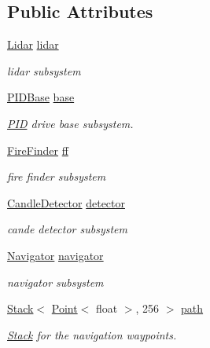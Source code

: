 \subsection*{Public Attributes}
\begin{DoxyCompactItemize}
\item 
\hyperlink{classLidar}{Lidar} \hyperlink{classRobot_a222e54f477e23f5af80cfa10bcd85e7a}{lidar}
\begin{DoxyCompactList}\small\item\em lidar subsystem \end{DoxyCompactList}\item 
\hyperlink{classPIDBase}{P\-I\-D\-Base} \hyperlink{classRobot_adbf538f97c0f9f98337f5171e715badc}{base}
\begin{DoxyCompactList}\small\item\em \hyperlink{classPID}{P\-I\-D} drive base subsystem. \end{DoxyCompactList}\item 
\hyperlink{classFireFinder}{Fire\-Finder} \hyperlink{classRobot_a342f5f8be2b5641eb3ae8f9c8475ebe6}{ff}
\begin{DoxyCompactList}\small\item\em fire finder subsystem \end{DoxyCompactList}\item 
\hyperlink{classCandleDetector}{Candle\-Detector} \hyperlink{classRobot_a19cb4c2ee87b595db9275e6b3d9ca30d}{detector}
\begin{DoxyCompactList}\small\item\em cande detector subsystem \end{DoxyCompactList}\item 
\hyperlink{classNavigator}{Navigator} \hyperlink{classRobot_a71e296a4f32c3a81b5a9fabeac12747b}{navigator}
\begin{DoxyCompactList}\small\item\em navigator subsystem \end{DoxyCompactList}\item 
\hyperlink{classStack}{Stack}$<$ \hyperlink{classPoint}{Point}$<$ float $>$, 256 $>$ \hyperlink{classRobot_a36d071e82aea40470cea9559477e5115}{path}
\begin{DoxyCompactList}\small\item\em \hyperlink{classStack}{Stack} for the navigation waypoints. \end{DoxyCompactList}\end{DoxyCompactItemize}
